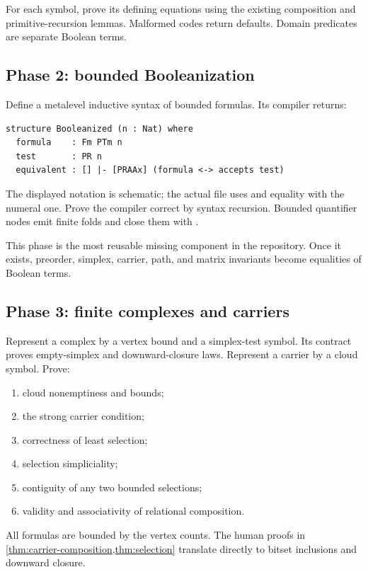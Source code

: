 For each symbol, prove its defining equations using the existing composition and primitive-recursion lemmas.  Malformed codes return defaults.  Domain predicates are separate Boolean terms.

\subsection{Phase 2: bounded Booleanization}

Define a metalevel inductive syntax of bounded formulas.  Its compiler returns:
\begin{lstlisting}[language={},caption={Required Booleanization interface}]
structure Booleanized (n : Nat) where
  formula    : Fm PTm n
  test       : PR n
  equivalent : [] |- [PRAAx] (formula <-> accepts test)
\end{lstlisting}
The displayed notation is schematic; the actual file uses  and equality with the numeral one.  Prove the compiler correct by syntax recursion.  Bounded quantifier nodes emit finite folds and close them with .

This phase is the most reusable missing component in the repository.  Once it exists, preorder, simplex, carrier, path, and matrix invariants become equalities of Boolean terms.

\subsection{Phase 3: finite complexes and carriers}

Represent a complex by a vertex bound and a simplex-test symbol.  Its contract proves empty-simplex and downward-closure laws.  Represent a carrier by a cloud symbol.  Prove:
\begin{enumerate}
  \item cloud nonemptiness and bounds;
  \item the strong carrier condition;
  \item correctness of least selection;
  \item selection simpliciality;
  \item contiguity of any two bounded selections;
  \item validity and associativity of relational composition.
\end{enumerate}

All formulas are bounded by the vertex counts.  The human proofs in \cref{thm:carrier-composition,thm:selection} translate directly to bitset inclusions and downward closure.

